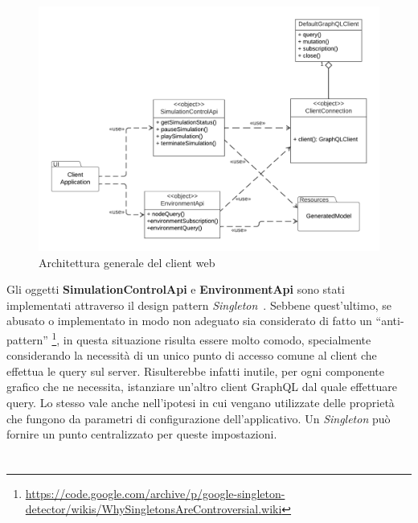 \begin{figure}[htb]
	\centering
	\includegraphics[scale=0.5]{imgs/General_Architecture_Web_Client.pdf}
	\caption{Architettura generale del client web}
	\label{fig:general-client-architecture-graphics}
\end{figure}

Gli oggetti \textbf{SimulationControlApi} e \textbf{EnvironmentApi} sono stati implementati attraverso il design pattern \textit{Singleton}~\cite{Gamma1994}. Sebbene quest'ultimo, se abusato o implementato in modo non adeguato sia considerato di fatto un ``anti-pattern'' \footnote{\url{https://code.google.com/archive/p/google-singleton-detector/wikis/WhySingletonsAreControversial.wiki}}, in questa situazione risulta essere molto comodo, specialmente considerando la necessità di un unico punto di accesso comune al client che effettua le query sul server. Risulterebbe infatti inutile, per ogni componente grafico che ne necessita, istanziare un'altro client GraphQL dal quale effettuare query. Lo stesso vale anche nell'ipotesi in cui vengano utilizzate delle proprietà che fungono da parametri di configurazione dell'applicativo. Un \textit{Singleton} può fornire un punto centralizzato per queste impostazioni.

\section{}



